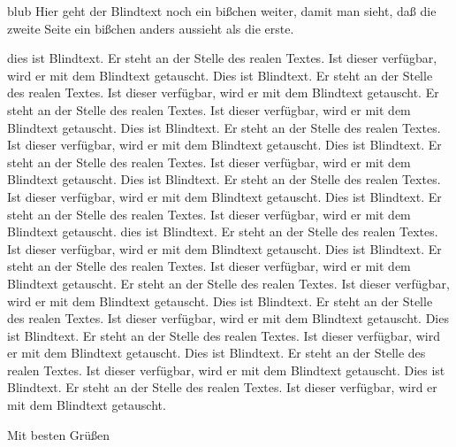 \documentclass[ngerman,fontsize=10pt,enlargefirstpage=on,parskip=full]{scrlttr2}
\begin{document}
\begin{letter}{blub}
Hier geht der Blindtext noch ein bißchen weiter, damit man sieht, daß die zweite Seite ein bißchen anders aussieht als die erste. 

dies ist Blindtext. Er steht an der Stelle des realen Textes. Ist dieser verfügbar, wird er mit dem Blindtext getauscht. Dies ist Blindtext. Er steht an der Stelle des realen Textes. Ist dieser verfügbar, wird er mit dem Blindtext getauscht. Er steht an der Stelle des realen Textes. Ist dieser verfügbar, wird er mit dem Blindtext getauscht. Dies ist Blindtext. Er steht an der Stelle des realen Textes. Ist dieser verfügbar, wird er mit dem Blindtext getauscht. Dies ist Blindtext. Er steht an der Stelle des realen Textes. Ist dieser verfügbar, wird er mit dem Blindtext getauscht. Dies ist Blindtext. Er steht an der Stelle des realen Textes. Ist dieser verfügbar, wird er mit dem Blindtext getauscht. Dies ist Blindtext. Er steht an der Stelle des realen Textes. Ist dieser verfügbar, wird er mit dem Blindtext getauscht.
dies ist Blindtext. Er steht an der Stelle des realen Textes. Ist dieser verfügbar, wird er mit dem Blindtext getauscht. Dies ist Blindtext. Er steht an der Stelle des realen Textes. Ist dieser verfügbar, wird er mit dem Blindtext getauscht. Er steht an der Stelle des realen Textes. Ist dieser verfügbar, wird er mit dem Blindtext getauscht. Dies ist Blindtext. Er steht an der Stelle des realen Textes. Ist dieser verfügbar, wird er mit dem Blindtext getauscht. Dies ist Blindtext. Er steht an der Stelle des realen Textes. Ist dieser verfügbar, wird er mit dem Blindtext getauscht. Dies ist Blindtext. Er steht an der Stelle des realen Textes. Ist dieser verfügbar, wird er mit dem Blindtext getauscht. Dies ist Blindtext. Er steht an der Stelle des realen Textes. Ist dieser verfügbar, wird er mit dem Blindtext getauscht.

\closing{Mit besten Grüßen}
\end{letter}
\end{document}

